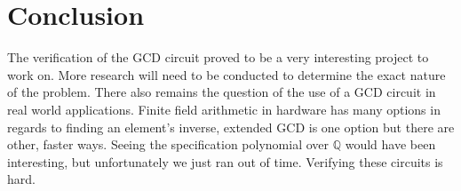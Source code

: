 \documentclass[12pt]{report}
\begin{document}
\section{Conclusion}

The verification of the GCD circuit proved to be a very interesting project to work on. More research will need to be conducted to determine the exact nature of the problem. There also remains the question of the use of a GCD circuit in real world applications. Finite field arithmetic in hardware has many options in regards to finding an element's inverse, extended GCD is one option but there are other, faster ways. Seeing the specification polynomial over $\mathbb{Q}$ would have been interesting, but unfortunately we just ran out of time. Verifying these circuits is hard.



%
\end{document}
